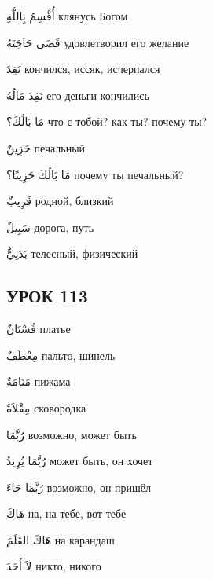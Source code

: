 \documentclass[a5paper]{article}
\newcommand\textstyleDropCaps[1]{#1}
\newcommand\textstyleCaptioncharacters[1]{#1}
\begin{document}
\textstyleCaptioncharacters{أُقْسِمُ بِاللَّهِ }\textstyleDropCaps{клянусь Бо­гом‎}

\textstyleCaptioncharacters{قَضَى حَاجَتَهُ }\textstyleDropCaps{удовле­творил его желание‎}

\textstyleCaptioncharacters{نَفِدَ }\textstyleDropCaps{кончился, иссяк, ис­черпался‎}

\textstyleCaptioncharacters{نَفِدَ مَالُهُ }\textstyleDropCaps{его деньги кон­чились‎}

\textstyleCaptioncharacters{مَا بَالُكَ؟ }\textstyleDropCaps{что с тобой? как ты? почему ты?‎}

\textstyleCaptioncharacters{حَزِينٌ }\textstyleDropCaps{печальный‎}

\textstyleCaptioncharacters{مَا بَالُكَ حَزِينًا؟ }\textstyleDropCaps{почему ты печальный? ‎}

\textstyleCaptioncharacters{قَرِيبٌ }\textstyleDropCaps{родной, близкий‎}

\textstyleCaptioncharacters{سَبِيلٌ }\textstyleDropCaps{дорога, путь‎}

\textstyleCaptioncharacters{بَدَنِيٌّ }\textstyleDropCaps{телесный, физиче­ский‎}

\subsection[УРОК 113‎]{\textstyleDropCaps{УРОК 113‎}}
\textstyleCaptioncharacters{فُسْتَانٌ }\textstyleDropCaps{платье‎}

\textstyleCaptioncharacters{مِعْطَفٌ }\textstyleDropCaps{пальто, шинель ‎}

\textstyleCaptioncharacters{مَنَامَةٌ }\textstyleDropCaps{пижама ‎}

\textstyleCaptioncharacters{مِقْلاَةٌ }\textstyleDropCaps{сковородка‎}

\textstyleCaptioncharacters{رُبَّمَا }\textstyleDropCaps{возможно, может быть‎}

\textstyleCaptioncharacters{رُبَّمَا يُرِيدُ }\textstyleDropCaps{может быть, он хочет‎}

\textstyleCaptioncharacters{رُبَّمَا جَاءَ }\textstyleDropCaps{возможно, он пришёл‎}

\textstyleCaptioncharacters{هَاكَ }\textstyleDropCaps{на, на тебе, вот тебе‎}

\textstyleCaptioncharacters{هَاكَ القَلَمَ }\textstyleDropCaps{на карандаш‎}

\textstyleCaptioncharacters{لاَ أَحَدَ }\textstyleDropCaps{никто, никого ‎}
\end{document}
